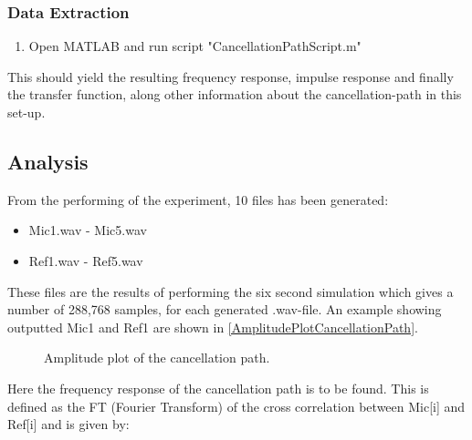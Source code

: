 \subsubsection{Data Extraction}
\begin{enumerate}
	\item Open MATLAB\textsuperscript{\textregistered} and run script "CancellationPathScript.m"
\end{enumerate}
This should yield the resulting frequency response, impulse response and finally the transfer function, along other information about the cancellation-path in this set-up.

\subsection{Analysis}

From the performing of the experiment, 10 files has been generated:
\begin{itemize}
	\item Mic1.wav - Mic5.wav
	\item Ref1.wav - Ref5.wav
\end{itemize}

These files are the results of performing the six second simulation which gives a number of 288,768 samples, for each generated .wav-file.
An example showing outputted Mic1 and Ref1 are shown in  \autoref{AmplitudePlotCancellationPath}.

\begin{figure}[H]
	\centering
	
	\caption{Amplitude plot of the cancellation path.}
	\label{AmplitudePlotCancellationPath}
\end{figure}

Here the frequency response of the cancellation path is to be found. This is defined as the FT (Fourier Transform) of the cross correlation between Mic[i] and Ref[i] and is given by:


